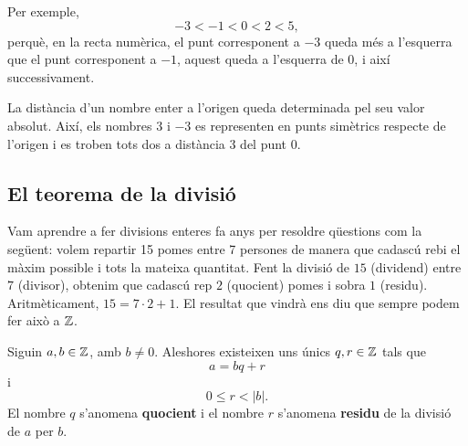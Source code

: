 Per exemple,
\[
	-3<-1<0<2<5,
\]
perquè, en la recta numèrica, el punt corresponent a \(-3\) queda més a l'esquerra que el punt corresponent a \(-1\), aquest queda a l'esquerra de \(0\), i així successivament.

La distància d'un nombre enter a l'origen queda determinada pel seu valor absolut. Així, els nombres \(3\) i \(-3\) es representen en punts simètrics respecte de l'origen i es troben tots dos a distància \(3\) del punt \(0\).

\subsection{El teorema de la divisió}

Vam aprendre a fer divisions enteres fa anys per resoldre qüestions com la següent: volem repartir 15 pomes entre 7 persones de manera que cadascú rebi el màxim possible i tots la mateixa quantitat. Fent la divisió de $15$ (dividend) entre $7$ (divisor), obtenim que cadascú rep $2$ (quocient) pomes i sobra $1$ (residu). Aritmèticament, $15=7\cdot 2+1$. El resultat que vindrà ens diu que sempre podem fer això a $\mathbb{Z}$.

\begin{teorema}\label{teo:divisio-enters}
Siguin $a,b\in\mathbb{Z}$, amb $b\neq 0$. Aleshores existeixen uns únics $q,r\in\mathbb{Z}$ tals que
\[
a=bq+r
\]
i
\[
0\leq r<|b|.
\]
El nombre $q$ s'anomena \textbf{quocient} i el nombre $r$ s'anomena \textbf{residu} de la divisió de $a$ per $b$.
\end{teorema}

